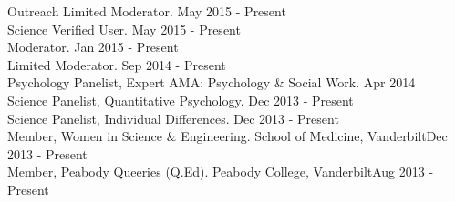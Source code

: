 \documentclass {resume}
\begin{document}
\pagebreak\begin{rSection}{\textrm{Outreach}}
Limited Moderator. \href{http://www.reddit.com/r/Science}{\color{blue}{Science, Reddit.com}}\hfill  {May 2015 - Present}\smallskip\\
Science Verified User. \href{http://www.reddit.com/r/science}{\color{blue}{Science, Reddit.com}}\hfill {May 2015 - Present}\smallskip\\
Moderator. \href{http://www.reddit.com/r/GradAdmissions}{\color{blue}{GradAdmissions, Reddit.com}}\hfill{Jan 2015 - Present}\smallskip\\
Limited Moderator. \href{http://www.reddit.com/r/AskScience}{\color{blue}{AskScience, Reddit.com}}\hfill  {Sep 2014 - Present}\smallskip\\
Psychology Panelist, Expert AMA: Psychology \& Social Work.  \href{http://www.reddit.com/r/AskSocialScience}{\color{blue}{AskSocialScience, Reddit.com}}\hfill{Apr 2014}\smallskip\\
Science Panelist, Quantitative Psychology.  \href{http://www.reddit.com/r/AskScience}{\color{blue}{AskScience, Reddit.com}}\hfill  {Dec 2013 - Present}\smallskip\\%
Science Panelist, Individual Differences.  \href{http://www.reddit.com/r/AskSocialScience}{\color{blue}{AskSocialScience, Reddit.com}}\hfill  {Dec 2013 - Present}\smallskip\\
Member, Women in Science \& Engineering. School of Medicine, Vanderbilt\hfill  {Dec 2013 - Present}\smallskip\\%
Member, Peabody Queeries (Q.Ed). Peabody College, Vanderbilt\hfill  {Aug 2013 - Present}%
\end{rSection}
\end{document}
